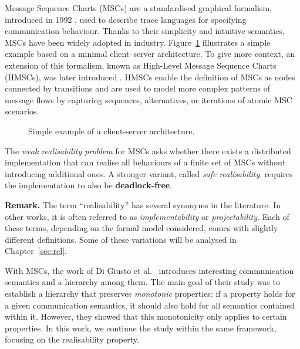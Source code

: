 Message Sequence Charts (MSCs) are a standardised graphical formalism,
introduced in 1992 \cite{MSCStandard}, used to describe trace languages 
for specifying communication behaviour. Thanks to their simplicity and 
intuitive semantics, MSCs have been widely adopted in industry.
Figure~\ref{fig:msc-cli-ser} illustrates a simple example based on a
minimal client–server architecture. To give more context, 
an extension of this formalism,
known as High-Level Message Sequence Charts (HMSCs), was later
introduced \cite{HMSCStandard}. HMSCs enable the definition of
MSCs as nodes connected by transitions and are used to model more
complex patterns of message flows by capturing sequences, alternatives,
or iterations of atomic MSC scenarios.

\begin{figure}[!ht]
\centering
\begin{msc}[draw frame=none, draw head=none, msc keyword=, head height=0px, label distance=0.5ex, foot height=0px, foot distance=0px]{}

	\nextlevel
\end{msc}
\caption{Simple example of a client-server architecture.}
\label{fig:msc-cli-ser}
\end{figure}

The \emph{weak realisability problem} for MSCs asks whether there 
exists a distributed implementation that can realise all behaviours of a 
finite set of MSCs without introducing additional ones. A stronger variant, 
called \emph{safe realisability}, requires the implementation to also be 
\textbf{deadlock-free}. 

\textbf{Remark.} The term ``realisability'' has several synonyms in the
literature. In other works, it is often referred to as 
\emph{implementability} or \emph{projectability}. Each of these terms, 
depending on the formal model considered, comes with slightly different 
definitions. Some of these variations will be analysed in 
Chapter~\ref{sec:rel}.

With MSCs, the work of Di Giusto et al.~\cite{di2023partial} introduces
interesting communication semantics and a hierarchy among them. The main
goal of their study was to establish a hierarchy that preserves
\emph{monotonic} properties: if a property holds for a given communication
semantics, it should also hold for all semantics contained within it.
However, they showed that this monotonicity only applies to certain
properties. In this work, we continue the study within the same framework,
focusing on the realisability property.  

